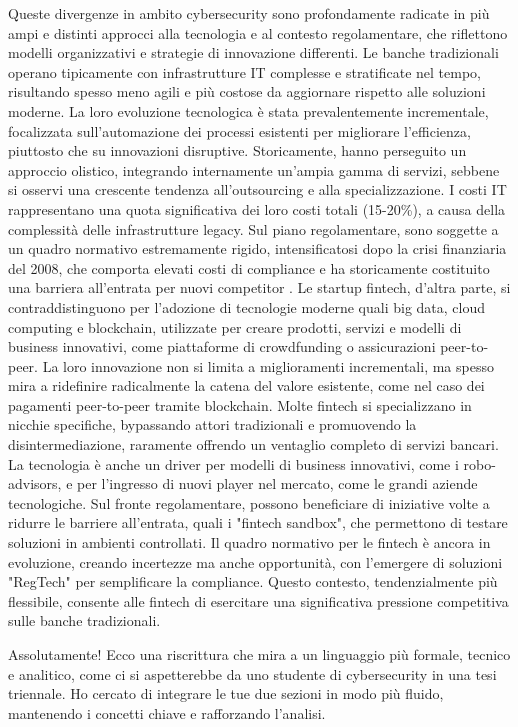 Queste divergenze in ambito cybersecurity sono profondamente radicate in più ampi e distinti approcci alla tecnologia e al contesto regolamentare, che riflettono modelli organizzativi e strategie di innovazione differenti.
Le banche tradizionali operano tipicamente con infrastrutture IT complesse e stratificate nel tempo, risultando spesso meno agili e più costose da aggiornare rispetto alle soluzioni moderne. La loro evoluzione tecnologica è stata prevalentemente incrementale, focalizzata sull'automazione dei processi esistenti per migliorare l'efficienza, piuttosto che su innovazioni disruptive. Storicamente, hanno perseguito un approccio olistico, integrando internamente un'ampia gamma di servizi, sebbene si osservi una crescente tendenza all'outsourcing e alla specializzazione. I costi IT rappresentano una quota significativa dei loro costi totali (15-20\%), a causa della complessità delle infrastrutture legacy. Sul piano regolamentare, sono soggette a un quadro normativo estremamente rigido, intensificatosi dopo la crisi finanziaria del 2008, che comporta elevati costi di compliance e ha storicamente costituito una barriera all'entrata per nuovi competitor .
Le startup fintech, d'altra parte, si contraddistinguono per l'adozione di tecnologie moderne quali big data, cloud computing e blockchain, utilizzate per creare prodotti, servizi e modelli di business innovativi, come piattaforme di crowdfunding o assicurazioni peer-to-peer. La loro innovazione non si limita a miglioramenti incrementali, ma spesso mira a ridefinire radicalmente la catena del valore esistente, come nel caso dei pagamenti peer-to-peer tramite blockchain. Molte fintech si specializzano in nicchie specifiche, bypassando attori tradizionali e promuovendo la disintermediazione, raramente offrendo un ventaglio completo di servizi bancari. La tecnologia è anche un driver per modelli di business innovativi, come i robo-advisors, e per l'ingresso di nuovi player nel mercato, come le grandi aziende tecnologiche. Sul fronte regolamentare, possono beneficiare di iniziative volte a ridurre le barriere all'entrata, quali i "fintech sandbox", che permettono di testare soluzioni in ambienti controllati. Il quadro normativo per le fintech è ancora in evoluzione, creando incertezze ma anche opportunità, con l'emergere di soluzioni "RegTech" per semplificare la compliance. Questo contesto, tendenzialmente più flessibile, consente alle fintech di esercitare una significativa pressione competitiva sulle banche tradizionali\cite{puschmann_fintech_2017}.

Assolutamente! Ecco una riscrittura che mira a un linguaggio più formale, tecnico e analitico, come ci si aspetterebbe da uno studente di cybersecurity in una tesi triennale. Ho cercato di integrare le tue due sezioni in modo più fluido, mantenendo i concetti chiave e rafforzando l'analisi.

